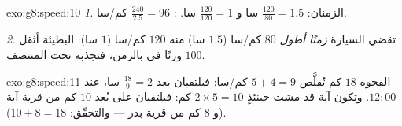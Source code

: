 \begin{solution}{exo:g8:speed:10}
\emph{1.} الزمنان: $\frac{120}{80} = 1.5$ سا و $\frac{120}{120} = 1$
سا. : $\frac{240}{2.5} = 96$ كم/سا.

\emph{2.} تقضي السيارة \emph{زمنًا أطول}  $80$ كم/سا ($1.5$ سا)
منه  $120$ كم/سا ($1$ سا):  البطيئة أثقل وزنًا في
 بالزمن، فتجذبه تحت المنتصف $100$.
\end{solution}

\begin{solution}{exo:g8:speed:11}
الفجوة $18$ كم تُقلَّص  $5 + 4 = 9$ كم/سا: فيلتقيان بعد
$\frac{18}{9} = 2$ سا، عند $12{:}00$. وتكون آية قد مشت حينئذٍ
$2 \times 5 = 10$ كم: فيلتقيان على بُعد $10$ كم من قرية آية (و
$8$ كم من قرية بدر --- والتحقّق: $10 + 8 = 18$).
\end{solution}

